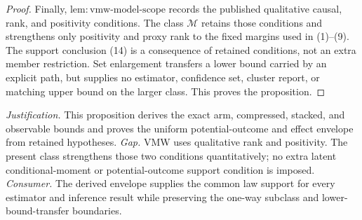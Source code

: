 \documentclass{article}
\begin{document}
\begin{proof}
Finally, \(\mathrm{lem:vmw\text{-}model\text{-}scope}\) records the published qualitative causal, rank, and positivity conditions.  The class \(\mathcal M\) retains those conditions and strengthens only positivity and proxy rank to the fixed margins used in (1)--(9).  The support conclusion (14) is a consequence of retained conditions, not an extra member restriction.  Set enlargement transfers a lower bound carried by an explicit path, but supplies no estimator, confidence set, cluster report, or matching upper bound on the larger class.  This proves the proposition.
\end{proof}
\par\smallskip\noindent \textit{Justification.} This proposition derives the exact arm, compressed, stacked, and observable bounds and proves the uniform potential-outcome and effect envelope from retained hypotheses. \textit{Gap.} VMW uses qualitative rank and positivity.  The present class strengthens those two conditions quantitatively; no extra latent conditional-moment or potential-outcome support condition is imposed. \textit{Consumer.} The derived envelope supplies the common law support for every estimator and inference result while preserving the one-way subclass and lower-bound-transfer boundaries.
\end{document}
